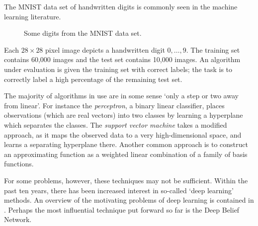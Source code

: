 \documentclass[cclicense]{hmcthesis}
\numberwithin{equation}{section}
\begin{document}
    \begin{example} 
    The MNIST data set of handwritten digits \citep{MNIST} is commonly seen in the
    machine learning literature.
    \begin{figure}[H]
        \centering
        \caption{Some digits from the MNIST data set.}
    \end{figure}
    \noindent Each $28\times28$ pixel image depicts a handwritten digit $0,
    \ldots, 9$.  The training set contains 60,000 images and the test set
    contains 10,000 images.  An algorithm under evaluation is given the training
    set with correct labels; the task is to correctly label a high percentage of
    the remaining test set.
    \end{example}

    The majority of algorithms in use are in some sense `only a step or two away
    from linear'.  For instance the \emph{perceptron}, a binary linear
    classifier, places observations (which are real vectors) into two classes by
    learning a hyperplane which separates the classes.  The \emph{support vector
    machine} takes a modified approach, as it maps the observed data to a very
    high-dimensional space, and learns a separating hyperplane there.  Another
    common approach is to construct an approximating function as a weighted
    linear combination of a family of basis functions.

    For some problems, however, these techniques may not be sufficient.  Within
    the past ten years, there has been increased interest in so-called `deep
    learning' methods.  An overview of the motivating problems of deep learning
    is contained in \citep{Ben09}.  Perhaps the most influential technique put
    forward so far is the Deep Belief Network.
\end{document}
